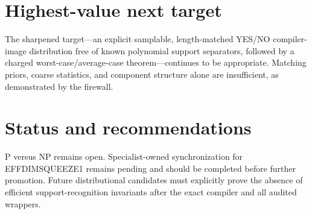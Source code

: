 \documentclass[11pt]{article}
\begin{document}
\section{Highest-value next target}
The sharpened target---an explicit samplable, length-matched YES/NO compiler-image distribution free of known polynomial support separators, followed by a charged worst-case/average-case theorem---continues to be appropriate. Matching priors, coarse statistics, and component structure alone are insufficient, as demonstrated by the firewall.

\section{Status and recommendations}
P versus NP remains open. Specialist-owned synchronization for EFFDIMSQUEEZE1 remains pending and should be completed before further promotion. Future distributional candidates must explicitly prove the absence of efficient support-recognition invariants after the exact compiler and all audited wrappers.

\end{document}
